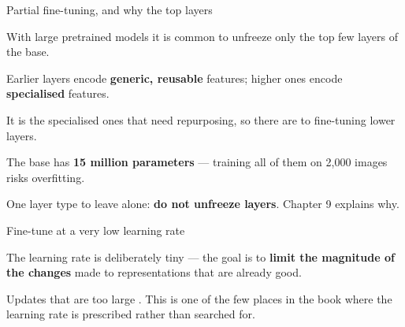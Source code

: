 \documentclass[aspectratio=169,11pt,t]{beamer}
\begin{document}
\begin{frame}{Partial fine-tuning, and why the top layers}
{\fontsize{9.4}{12.6}\selectfont\color{fg2}With large pretrained models it is common to unfreeze only the top few layers of the base.\par}\vskip 4pt
\begin{minipage}[t]{0.485\textwidth}
\begin{ibullets}
\item Earlier layers encode \textbf{generic, reusable} features; higher ones encode \textbf{specialised} features.
\item It is the specialised ones that need repurposing, so there are  to fine-tuning lower layers.
\item The base has \textbf{15 million parameters} --- training all of them on 2,000 images risks overfitting.
\end{ibullets}

\end{minipage}%
\hfill
\begin{minipage}[t]{0.485\textwidth}

\end{minipage}%
\begin{iband}[amber]
One layer type to leave alone: \textbf{do not unfreeze  layers}. Chapter 9 explains why.
\end{iband}
\end{frame}

\begin{frame}[shrink=25]{Fine-tune at a very low learning rate}
{\fontsize{9.4}{12.6}\selectfont\color{fg2}The learning rate is deliberately tiny --- the goal is to \textbf{limit the magnitude of the changes} made to representations that are already good.\par}\vskip 4pt
\begin{iband}[signal]
Updates that are too large . This is one of the few places in the book where the learning rate is prescribed rather than searched for.
\end{iband}
\end{frame}
\end{document}
